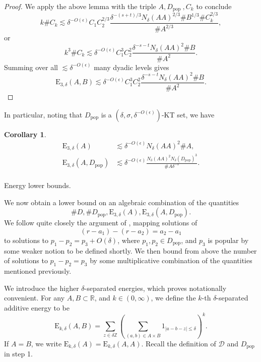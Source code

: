 \documentclass[12pt]{amsart}
\newtheorem{corollary}[theorem]{Corollary}
\newcounter{stepctr}
\newif\ifinsteppage
\newenvironment{steps}{%
	\setcounter{stepctr}{0}%
	\insteppagefalse
}{%
	\par\bigskip
}
\newcommand{\step}[1]{%
	\ifinsteppage
	\par\bigskip
	\fi
	\insteppagetrue
	\refstepcounter{stepctr}%
	\noindent\text{Step \thestepctr:} #1.\par
}
\newcommand{\dem}{\de^{-O(\e)}}
\newcommand{\cD}{\mathcal{D}}
\newcommand{\pop}{D_{\mathrm{pop}}}
\newcommand{\1}{\mathbf{1}}
\newcommand{\en}[2]{\mathrm{E}_{#1,#2}}
\newcommand{\de}{\delta}
\newcommand{\e}{\epsilon}
\newcommand{\cn}[1]{N_\de({#1})}
\begin{document}
\begin{steps}
\begin{proof}
We apply the above lemma with the triple \(A, D_{\text {pop }}, C_k\) to conclude
\[
    k \# C_{k}  \lesssim  \delta^{-O(\epsilon)} C_1 C_2^{2 / 3} \frac{\delta^{-(s+t) / 3} N_\delta(A A)^{2 / 3} \# B^{1 / 3} \# C_{k} ^{2 / 3}}{\# A^{2 / 3}}
,\]
or
\[
    k^{3} \# C_{k} \lesssim \delta^{- O(\epsilon)} C_1^{3}  C_2 ^{2}\frac{ \delta^{-s - t} N_{\delta} (AA)^{2} \# B}{\# A ^{2}} 
.\]
Summing over all \(\lesssim \delta^{- O(\epsilon)}\) many dyadic levels gives
\[
    \mathrm{E} _{3,\delta} (A,B)\lesssim \delta^{- O(\epsilon)} C_1^{3}  C_2 ^{2}\frac{ \delta^{-s - t} N_{\delta} (AA)^{2} \# B}{\# A ^{2}} 
.\]
\end{proof}
In particular, noting that \(D_{\text{pop}} \) is a \((\delta,\sigma,\delta^{- O(\epsilon)})\)-KT set, we have
\begin{corollary}\label{cor:energybounds}
		\begin{align}
			\en 3 \de (A) &\lesssim \dem \cn{AA}^2 \#A,\\
			\en 3 \de (A,\pop) &\lesssim \dem\frac{\cn{AA}^2 \cn{\pop}^3}{\#A\de^{-\sigma}}.\\
		\end{align}
	\end{corollary}
    \step{Energy lower bounds}
	We now obtain a lower bound on an algebraic combination of the quantities $$ \#D, \#\pop, \en 3 \de(A), \en 3 \de (A,\pop).$$ 
We follow quite closely the argument of \cite[Lemma 1.6]{csumproduct}, mapping solutions of
\[
	(r - a_1) - (r - a_2) = a_2 - a_1
\]
to solutions to \(p_1 - p_2 = p_3 + O(\de) \), where \(p_1,p_2 \in D_{\text{pop}}\), and
\(p_3\) is popular by some weaker notion to be defined shortly. 
We then bound from above the number
of solutions to \(p_1-p_2 = p_3\) by some multiplicative combination of the quantities mentioned previously.


\end{steps}

We introduce the higher \(\delta\)-separated energies, which
proves notationally convenient. 
For any \(A,B \subset \mathbb{R} \), and \(k \in (0,\infty )\), we define the \(k\)-th \(\delta\)-separated additive energy to be
\[
	\mathrm{E} _{k,\delta} (A,B) = \sum _{z \in \delta \mathbb{Z} } \left( \sum _{(a,b)\in A \times B} 1_{\left\lvert a - b - z \right\rvert \leq \delta} 	 \right) ^{k}
.\]
If \(A=B\), we write \(\mathrm{E}_{k,\de}(A)= \mathrm{E}_{k,\de}(A,A)\).
Recall the definition of $\cD$ and $\pop$ in step 1.
\end{document}
